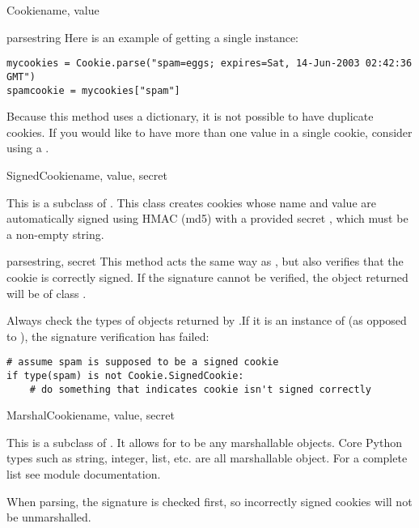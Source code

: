\begin{classdesc}{Cookie}{name, value}
\begin{methoddesc}[Cookie]{parse}{string}
    Here is an example of getting a single  instance:
    \begin{verbatim}
mycookies = Cookie.parse("spam=eggs; expires=Sat, 14-Jun-2003 02:42:36 GMT")
spamcookie = mycookies["spam"]
    \end{verbatim}

    \begin{notice}
      Because this method uses a dictionary, it is not possible to
      have duplicate cookies. If you would like to have more than one
      value in a single cookie, consider using a .
    \end{notice}

  \end{methoddesc}

\end{classdesc}

\begin{classdesc}{SignedCookie}{name, value, secret}

  This is a subclass of . This class creates cookies
  whose name and value are automatically signed using HMAC (md5) with
  a provided secret , which must be a non-empty string.

  \begin{methoddesc}[SignedCookie]{parse}{string, secret}
    This method acts the same way as , but also
    verifies that the cookie is correctly signed. If the signature
    cannot be verified, the object returned will be of class
    .

    \begin{notice}
      Always check the types of objects returned by
      .If it is an instance of
       (as opposed to ), the
      signature verification has failed:
      \begin{verbatim}
# assume spam is supposed to be a signed cookie
if type(spam) is not Cookie.SignedCookie:
    # do something that indicates cookie isn't signed correctly
      \end{verbatim}
    \end{notice}
  \end{methoddesc}

\end{classdesc}

\begin{classdesc}{MarshalCookie}{name, value, secret}

  This is a subclass of . It allows for
   to be any marshallable objects. Core Python types such as
  string, integer, list, etc. are all marshallable object. For a
  complete list see
  module documentation.

  When parsing, the signature is checked first, so incorrectly signed cookies
  will not be unmarshalled.

\end{classdesc}

